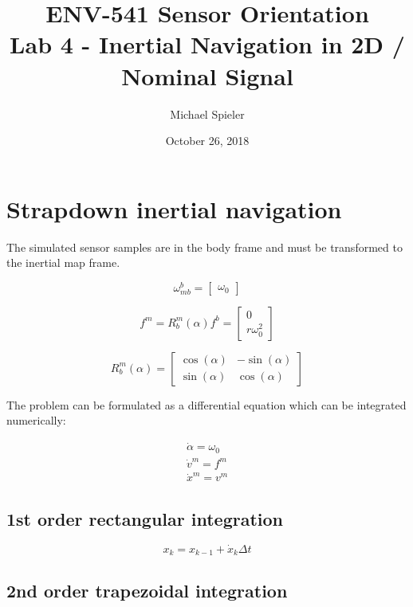 \documentclass{article}
\title{ENV-541 Sensor Orientation\\Lab 4 - Inertial Navigation in 2D / Nominal Signal}
\author{Michael Spieler}
\date{October 26, 2018}
\begin{document}
\maketitle

\section*{Strapdown inertial navigation}

The simulated sensor samples are in the body frame and must be transformed to the inertial map frame.

\begin{equation*}
\omega_{mb}^b = \begin{bmatrix} \omega_0 \end{bmatrix}
\end{equation*}

\begin{equation*}
f^m = R_b^m(\alpha) f^b = \begin{bmatrix} 0 \\ r \omega_0^2 \end{bmatrix}
\end{equation*}

\begin{equation*}
R_b^m(\alpha) = \begin{bmatrix}
    \cos(\alpha) & -\sin(\alpha) \\
    \sin(\alpha) & \cos(\alpha)
    \end{bmatrix}
\end{equation*}

The problem can be formulated as a differential equation which can be integrated numerically:

\begin{align*}
\dot \alpha = \omega_0 \\
\dot v^m = f^m \\
\dot x^m = v^m
\end{align*}

\subsection*{1st order rectangular integration}

\begin{equation*}
x_k = x_{k-1} + \dot x_k \Delta t 
\end{equation*}

\subsection*{2nd order trapezoidal integration}
\end{document}
